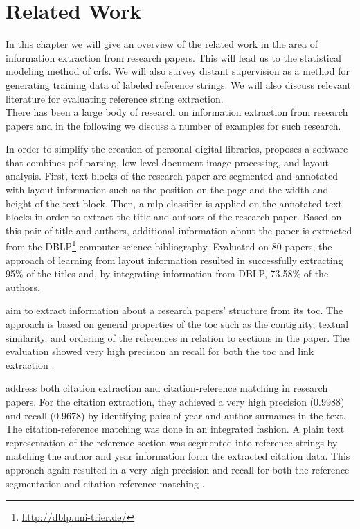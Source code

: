 \chapter{Related Work}\label{cha:related-work}
In this chapter we will give an overview of the related work in the area of information extraction from research papers. This will lead us to the statistical modeling method of \glspl{crf}. We will also survey distant supervision as a method for generating training data of labeled reference strings. We will also discuss relevant literature for evaluating reference string extraction.\\

There has been a large body of research on information extraction from research papers and in the following we discuss a number of examples for such research.

In order to simplify the creation of personal digital libraries, \citet{marinai2009metadata} proposes a software that combines \gls{pdf} parsing, low level document image processing, and layout analysis. First, text blocks of the research paper are segmented and annotated with layout information such as the position on the page and the width and height of the text block. Then, a \gls{mlp} classifier is applied on the annotated text blocks in order to extract the title and authors of the research paper. Based on this pair of title and authors, additional information about the paper is extracted from the DBLP\footnote{\url{http://dblp.uni-trier.de/}} computer science bibliography. Evaluated on 80 papers, the approach of learning from layout information resulted in successfully extracting 95\% of the titles and, by integrating information from DBLP, 73.58\% of the authors.

\citet{dejean2005structuring} aim to extract information about a research papers' structure from its \gls{toc}. The approach is based on general properties of the \gls{toc} such as the contiguity, textual similarity, and ordering of the references in relation to sections in the paper. The evaluation showed very high precision an recall for both the \gls{toc} and link extraction \citep{dejean2005structuring}.

\citet{powley2007evidence} address both citation extraction and citation-reference matching in research papers. For the citation extraction, they achieved a very high precision (0.9988) and recall (0.9678) by identifying pairs of year and author surnames in the text. The citation-reference matching was done in an integrated fashion. A plain text representation of the reference section was segmented into reference strings by matching the author and year information form the extracted citation data. This approach again resulted in a very high precision and recall for both the reference segmentation and citation-reference matching \citep{powley2007evidence}.

